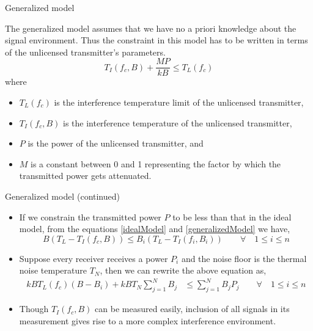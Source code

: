 \documentclass[mathserif]{beamer}
\begin{document}
\begin{frame}{Generalized model}

The generalized model assumes that we have no a priori knowledge about the signal environment. Thus the constraint in this model has to be written in terms of the unlicensed transmitter's parameters.
\begin{equation}
    T_I(f_c,B) + \frac{MP}{kB} \leq T_L(f_c) \label{generalizedModel}
\end{equation}
where
\pause
\begin{itemize}
	\item $T_L(f_c)$ is the interference temperature limit of the unlicensed transmitter,
	\item $T_I(f_c,B)$ is the interference temperature of the unlicensed transmitter, 
	\item $P$ is the power of the unlicensed transmitter, and
	\item $M$ is a constant between 0 and 1 representing the factor by which the transmitted power gets attenuated.
\end{itemize}

\end{frame}





\begin{frame}{Generalized model (continued)}

\begin{itemize}
\item If we constrain the transmitted power $P$ to be less than that in the ideal model, from the equations \eqref{idealModel} and \eqref{generalizedModel} we have,
\begin{equation*}
    B(T_L - T_I(f_c,B)) \leq  B_i(T_L - T_I(f_i,B_i)) \qquad \forall \quad 1 \leq i \leq n \label{powerCompare}
\end{equation*}
\item Suppose every receiver receives a power $P_i$ and  the noise floor is the thermal noise temperature $T_N$, then we can rewrite the above equation as,
\begin{align*}
    kBT_L(f_c)(B-B_i) + kBT_N\sum_{j=1}^{N}B_j & \leq \sum_{j=1}^{N}B_jP_j \qquad \forall \quad 1 \leq i\leq n
\end{align*}

\pause
\item
Though $T_I(f_c,B)$ can be measured easily, inclusion of all signals in its measurement gives rise to a more complex interference environment.
\end{itemize}

\end{frame}
\end{document}
